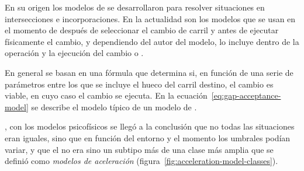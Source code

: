 En su origen los modelos de \textit{} se desarrollaron para resolver situaciones en intersecciones e incorporaciones. En la actualidad son los modelos que se usan en el momento de después de seleccionar el cambio de carril y antes de ejecutar físicamente el cambio, y dependiendo del autor del modelo, lo incluye dentro de la operación \textit{} y la ejecución del cambio o \textbf{}.

En general se basan en una fórmula que determina si, en función de una serie de parámetros entre los que se incluye el hueco del carril destino, el cambio es viable, en cuyo caso el cambio se ejecuta. En la ecuación~\ref{eq:gap-acceptance-model} se describe el modelo típico de un modelo de . 


, con los modelos psicofísicos se llegó a la conclusión que no todas las situaciones eran iguales, sino que en función del entorno y el momento los umbrales podían variar, y que el \textit{} no era sino un subtipo más de una clase más amplia que se definió como \textit{modelos de aceleración} (figura~\ref{fig:acceleration-model-classes}).

